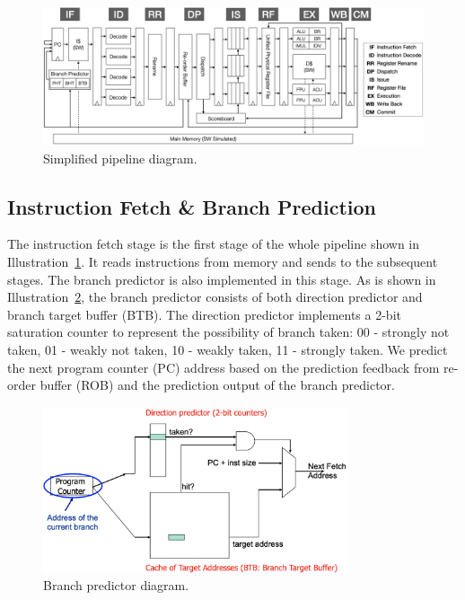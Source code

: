 \begin{figure}
    \centering
    \includegraphics[width=\textwidth]{figure/design.png}
    \caption{Simplified pipeline diagram.}
    \label{fig:pipeline}
\end{figure}

\subsection{Instruction Fetch \& Branch Prediction} %
The instruction fetch stage is the first stage of the whole pipeline shown in Illustration~\ref{fig:pipeline}. It reads instructions from memory and sends to the subsequent stages. The branch predictor is also implemented in this stage. As is shown in Illustration~\ref{fig:br_pred}, the branch predictor consists of both direction predictor and branch target buffer (BTB). The direction predictor implements a 2-bit saturation counter to represent the possibility of branch taken: 00 - strongly not taken, 01 - weakly not taken, 10 - weakly taken, 11 - strongly taken. We predict the next program counter (PC) address based on the prediction feedback from re-order buffer (ROB) and the prediction output of the branch predictor.

\begin{figure}[!htp]
    \centering
    \includegraphics[width=0.8\textwidth]{figure/branch_predictor.png}
    \caption{Branch predictor diagram.}
    \label{fig:br_pred}
\end{figure}

